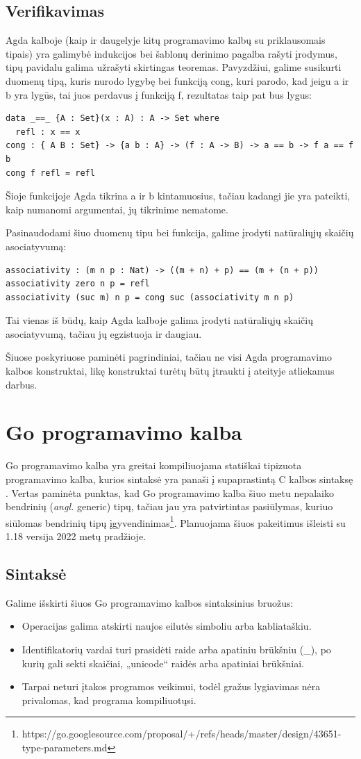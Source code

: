 \documentclass{VUMIFPSkursinis}
\begin{document}
\subsection{Verifikavimas}
Agda kalboje (kaip ir daugelyje kitų programavimo kalbų su priklausomais tipais) yra galimybė indukcijos bei šablonų derinimo pagalba rašyti įrodymus, tipų pavidalu galima užrašyti skirtingas teoremas. Pavyzdžiui, galime susikurti duomenų tipą, kuris nurodo lygybę bei funkciją cong, kuri parodo, kad jeigu a ir b yra lygūs, tai juos perdavus į funkciją f, rezultatas taip pat bus lygus:
\begin{lstlisting}
data _==_ {A : Set}(x : A) : A -> Set where
  refl : x == x
cong : { A B : Set} -> {a b : A} -> (f : A -> B) -> a == b -> f a == f b
cong f refl = refl
	\end{lstlisting}
Šioje funkcijoje Agda tikrina a ir b kintamuosius, tačiau kadangi jie yra pateikti, kaip numanomi argumentai, jų tikrinime nematome.\par Pasinaudodami šiuo duomenų tipu bei funkcija, galime įrodyti natūraliųjų  skaičių asociatyvumą:
\begin{lstlisting}
associativity : (m n p : Nat) -> ((m + n) + p) == (m + (n + p))
associativity zero n p = refl
associativity (suc m) n p = cong suc (associativity m n p)
\end{lstlisting}
Tai vienas iš būdų, kaip Agda kalboje galima įrodyti natūraliųjų skaičių asociatyvumą, tačiau jų egzistuoja ir daugiau.
\par Šiuose poskyriuose paminėti pagrindiniai, tačiau ne visi Agda programavimo kalbos konstruktai, likę konstruktai turėtų būtų įtraukti į ateityje atliekamus darbus.
\section{Go programavimo kalba}
Go programavimo kalba yra greitai kompiliuojama statiškai tipizuota programavimo kalba, kurios sintaksė yra panaši į supaprastintą C kalbos sintaksę \cite{Go}. Vertas paminėta punktas, kad Go programavimo kalba šiuo metu nepalaiko bendrinių (\textit{angl.} generic) tipų, tačiau jau yra patvirtintas pasiūlymas, kuriuo siūlomas bendrinių tipų įgyvendinimas\footnote{https://go.googlesource.com/proposal/+/refs/heads/master/design/43651-type-parameters.md}. Planuojama šiuos pakeitimus išleisti su 1.18 versija 2022 metų pradžioje.
\subsection{Sintaksė}
Galime išskirti šiuos Go programavimo kalbos sintaksinius bruožus:
\begin{itemize}
	\item Operacijas galima atskirti naujos eilutės simboliu arba kabliataškiu.
	\item Identifikatorių vardai turi prasidėti raide arba apatiniu brūkšniu (\_), po kurių gali sekti skaičiai, „unicode“ raidės arba apatiniai brūkšniai.
	\item Tarpai neturi įtakos programos veikimui, todėl gražus lygiavimas nėra privalomas, kad programa kompiliuotųsi.
\end{itemize}
\end{document}
